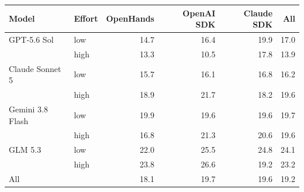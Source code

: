 \begin{tabular}{ll rrr r}
\toprule
Model & Effort & OpenHands & OpenAI SDK & Claude SDK & All \\
\midrule
GPT-5.6 Sol & low & 14.7 & 16.4 & 19.9 & 17.0 \\
 & high & 13.3 & 10.5 & 17.8 & 13.9 \\
Claude Sonnet 5 & low & 15.7 & 16.1 & 16.8 & 16.2 \\
 & high & 18.9 & 21.7 & 18.2 & 19.6 \\
Gemini 3.8 Flash & low & 19.9 & 19.6 & 19.6 & 19.7 \\
 & high & 16.8 & 21.3 & 20.6 & 19.6 \\
GLM 5.3 & low & 22.0 & 25.5 & 24.8 & 24.1 \\
 & high & 23.8 & 26.6 & 19.2 & 23.2 \\
\midrule
\multicolumn{2}{l}{All} & 18.1 & 19.7 & 19.6 & 19.2 \\
\bottomrule
\end{tabular}